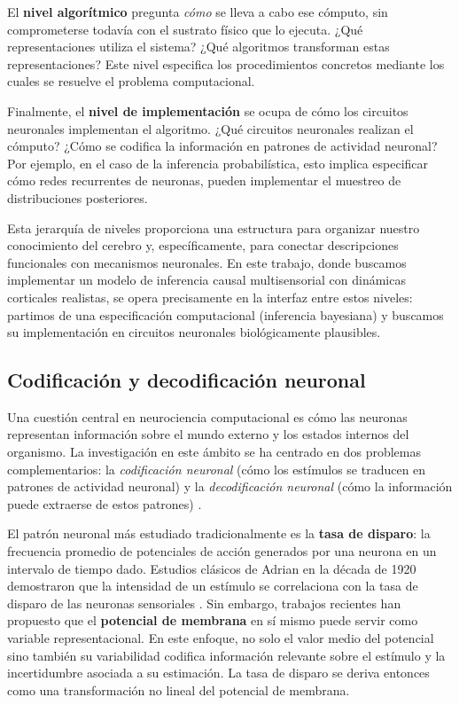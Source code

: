El \textbf{nivel algorítmico} pregunta \textit{cómo} se lleva a cabo ese cómputo, sin comprometerse todavía con el sustrato físico que lo ejecuta. ¿Qué representaciones utiliza el sistema? ¿Qué algoritmos transforman estas representaciones? Este nivel especifica los procedimientos concretos mediante los cuales se resuelve el problema computacional.

Finalmente, el \textbf{nivel de implementación} se ocupa de cómo los circuitos neuronales implementan el algoritmo. ¿Qué circuitos neuronales realizan el cómputo? ¿Cómo se codifica la información en patrones de actividad neuronal? Por ejemplo, en el caso de la inferencia probabilística, esto implica especificar cómo redes recurrentes de neuronas, pueden implementar el muestreo de distribuciones posteriores.

Esta jerarquía de niveles proporciona una estructura para organizar nuestro conocimiento del cerebro y, específicamente, para conectar descripciones funcionales con mecanismos neuronales. En este trabajo, donde buscamos implementar un modelo de inferencia causal multisensorial con dinámicas corticales realistas, se opera precisamente en la interfaz entre estos niveles: partimos de una especificación computacional (inferencia bayesiana) y buscamos su implementación en circuitos neuronales biológicamente plausibles.

\subsection{Codificación y decodificación neuronal}
\label{subsec:codificacion_neuronal}

Una cuestión central en neurociencia computacional es cómo las neuronas representan información sobre el mundo externo y los estados internos del organismo. La investigación en este ámbito se ha centrado en dos problemas complementarios: la \textit{codificación neuronal} (cómo los estímulos se traducen en patrones de actividad neuronal) y la \textit{decodificación neuronal} (cómo la información puede extraerse de estos patrones) \citep{dayan2005theoretical}.

El patrón neuronal más estudiado tradicionalmente es la \textbf{tasa de disparo}: la frecuencia promedio de potenciales de acción generados por una neurona en un intervalo de tiempo dado. Estudios clásicos de Adrian en la década de 1920 demostraron que la intensidad de un estímulo se correlaciona con la tasa de disparo de las neuronas sensoriales \citep{blanco2014historia}. Sin embargo, trabajos recientes han propuesto que el \textbf{potencial de membrana} en sí mismo puede servir como variable representacional. En este enfoque, no solo el valor medio del potencial sino también su variabilidad codifica información relevante sobre el estímulo y la incertidumbre asociada a su estimación. La tasa de disparo se deriva entonces como una transformación no lineal del potencial de membrana.

